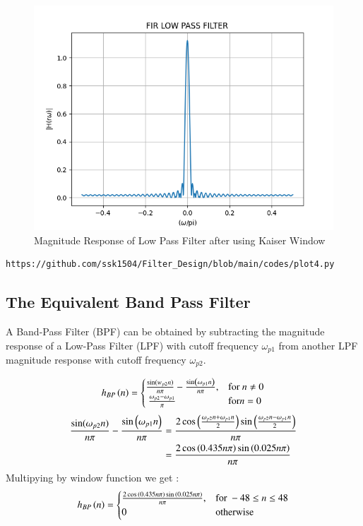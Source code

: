 \documentclass{article}
\begin{document}
\begin{figure}[H]
\centering
\includegraphics[width=1\columnwidth]{figs/FIR_Low_Filter.png}
\caption{Magnitude Response of Low Pass Filter after using Kaiser Window}
\label{fig:Kaiser_LPF_response}
\end{figure}
\begin{lstlisting}
https://github.com/ssk1504/Filter_Design/blob/main/codes/plot4.py
\end{lstlisting}

\subsection{The Equivalent Band Pass Filter}
A Band-Pass Filter (BPF) can be obtained by subtracting the magnitude response of a Low-Pass Filter (LPF) with cutoff frequency $\omega_{p1}$ from another LPF magnitude response with cutoff frequency $\omega_{p2}$.

\begin{align}
    h_{BP}\left(n\right) = 
\begin{cases} 
    \frac{\sin(w_{p2} n)}{n\pi} -\frac{\sin\left(\omega_{p1}n\right)}{n\pi},  & \text{for } n\neq 0\\\
    \frac{\omega_{p2}-\omega_{p1}}{\pi} &\text{for} n= 0
\end{cases} 
\end{align}
\begin{align}
     \frac{\sin(\omega_{p2} n)}{n\pi} -\frac{\sin\left(\omega_{p1}n\right)}{n\pi} &= \frac{2\cos{\ensuremath{\left(\frac{\omega_{p2}n+\omega_{p1}n}{2}\right)}}\sin{\ensuremath{\left(\frac{\omega_{p2}n-\omega_{p1}n}{2}\right)}}}{n\pi}\\
            &= \frac{2\cos{\ensuremath{\left(0.435n\pi\right)}}\sin{\ensuremath{\left(0.025n\pi\right)}}}{n\pi}
\end{align}
Multipying by window function we get :
\begin{align}
    h_{BP}\left(n\right) = 
\begin{cases} 
   \frac{2\cos{\ensuremath{\left(0.435n\pi\right)}}\sin{\ensuremath{\left(0.025n\pi\right)}}}{n\pi},  & \text{for } -48\leq n \leq 48 \\
    0 &\text{otherwise}
\end{cases} 
\end{align}
\end{document}
